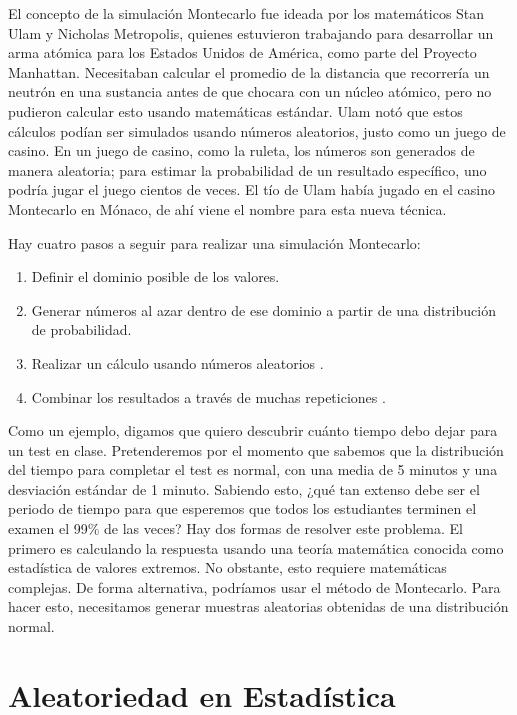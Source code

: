 \documentclass[
  12pt,
]{book}
\providecommand{\tightlist}{%
  \setlength{\itemsep}{0pt}\setlength{\parskip}{0pt}}
\begin{document}
El concepto de la simulación Montecarlo fue ideada por los matemáticos Stan Ulam y Nicholas Metropolis, quienes estuvieron trabajando para desarrollar un arma atómica para los Estados Unidos de América, como parte del Proyecto Manhattan. Necesitaban calcular el promedio de la distancia que recorrería un neutrón en una sustancia antes de que chocara con un núcleo atómico, pero no pudieron calcular esto usando matemáticas estándar.
Ulam notó que estos cálculos podían ser simulados usando números aleatorios, justo como un juego de casino. En un juego de casino, como la ruleta, los números son generados de manera aleatoria; para estimar la probabilidad de un resultado específico, uno podría jugar el juego cientos de veces. El tío de Ulam había jugado en el casino Montecarlo en Mónaco, de ahí viene el nombre para esta nueva técnica.

Hay cuatro pasos a seguir para realizar una simulación Montecarlo:

\begin{enumerate}
\def\labelenumi{\arabic{enumi}.}
\tightlist
\item
  Definir el dominio posible de los valores.
\item
  Generar números al azar dentro de ese dominio a partir de una distribución de probabilidad.
\item
  Realizar un cálculo usando números aleatorios .
\item
  Combinar los resultados a través de muchas repeticiones .
\end{enumerate}

Como un ejemplo, digamos que quiero descubrir cuánto tiempo debo dejar para un test en clase. Pretenderemos por el momento que sabemos que la distribución del tiempo para completar el test es normal, con una media de 5 minutos y una desviación estándar de 1 minuto. Sabiendo esto, ¿qué tan extenso debe ser el periodo de tiempo para que esperemos que todos los estudiantes terminen el examen el 99\% de las veces? Hay dos formas de resolver este problema. El primero es calculando la respuesta usando una teoría matemática conocida como estadística de valores extremos. No obstante, esto requiere matemáticas complejas. De forma alternativa, podríamos usar el método de Montecarlo. Para hacer esto, necesitamos generar muestras aleatorias obtenidas de una distribución normal.

\hypertarget{aleatoriedad-en-estaduxedstica}{%
\section{Aleatoriedad en Estadística}\label{aleatoriedad-en-estaduxedstica}}
\end{document}
